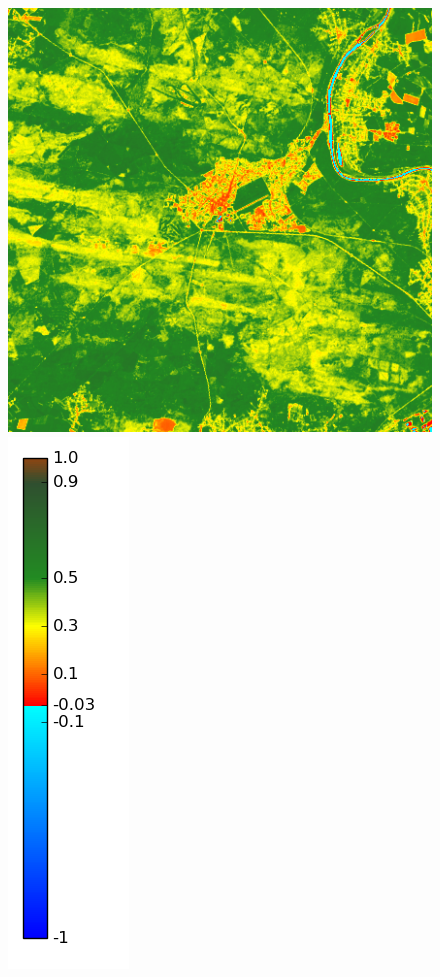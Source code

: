 \documentclass{book}
\begin{document}
\begin{figure}[H]
{\includegraphics[scale=0.25]{images/Fontainebleau/05_ndvi.png}
\includegraphics[scale=0.2]{images/colormap.png}
}
\end{figure}
\end{document}
